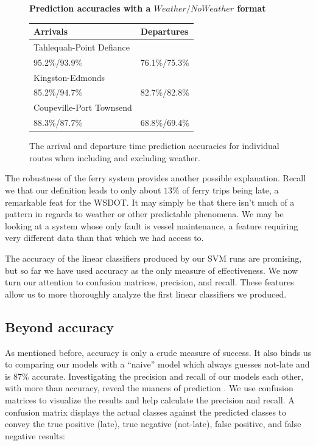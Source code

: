 \documentclass[11pt]{article} %
\begin{document}
\begin{figure}
    \centering
    \textbf{Prediction accuracies with a $Weather/NoWeather$ format}

    \begin{tabular}{ll}
        \textbf{Arrivals} & \textbf{Departures}\\
        \hline
        Tahlequah-Point Defiance    & \\
        95.2\%/93.9\% & 76.1\%/75.3\% \\
        Kingston-Edmonds    & \\
        85.2\%/94.7\% & 82.7\%/82.8\% \\
        Coupeville-Port Townsend     & \\
        88.3\%/87.7\% & 68.8\%/69.4\% 
    \end{tabular}
    \caption{The arrival and departure time prediction accuracies for individual 
        routes when including and excluding weather.}
    \label{fig:weatherExperiment}
\end{figure}

The robustness of the ferry system provides another possible explanation. Recall 
we that
our definition leads to only about $13\%$ of ferry trips being late, a remarkable 
feat for the WSDOT. It may simply be that there isn't much of a pattern in regards
to weather or other predictable phenomena. We may be looking at a system whose
only fault is vessel maintenance, a feature requiring very different data than
that which we had access to. 

The accuracy of the linear classifiers produced by our SVM runs are promising,
but so far we have used accuracy as the only measure of effectiveness. We now 
turn our attention to confusion matrices, precision, and recall. These features
allow us to more thoroughly analyze the first linear classifiers we produced.

\subsection{Beyond accuracy}
\label{sec:beyond_accuracy}
As mentioned before, accuracy is only a crude measure of success. It also binds us
to comparing our models with a ``naive'' model which always guesses not-late and
is $87\%$ accurate. Investigating the precision and recall of our models each other,
with more than accuracy, reveal the nuances of prediction \cite{classifierEval}. 
We use confusion matrices to visualize the results and help calculate the 
precision and recall. A confusion matrix displays the actual classes against 
the predicted classes to convey the true positive (late), true negative 
(not-late), false positive, and false negative results:
\end{document}
